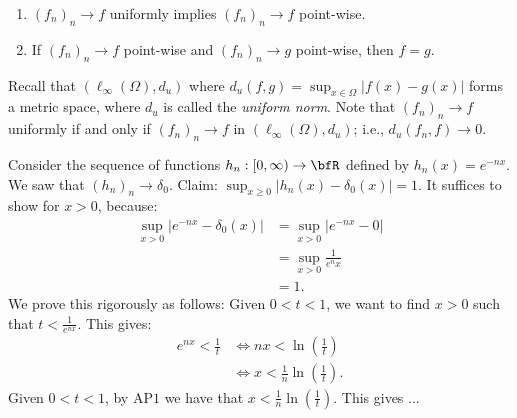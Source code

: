     \begin{proposition}
        \phantom{a}
        \begin{enumerate}[label = (\arabic*)]
            \item $(f_n)_n \rightarrow f$ uniformly implies $(f_n)_n \rightarrow f$ point-wise.
            \item If $(f_n)_n \rightarrow f$ point-wise and $(f_n)_n \rightarrow g$ point-wise, then $f = g$.
        \end{enumerate}
    \end{proposition}

    \begin{note}
        Recall that $(\ell_\infty(\Omega),d_u)$ where $d_u(f,g) = \sup_{x \in \Omega}|f(x)-g(x)|$ forms a metric space, where $d_u$ is called the \textit{uniform norm}. Note that $(f_n)_n \rightarrow f$ uniformly if and only if $(f_n)_n \rightarrow f$ in $(\ell_\infty(\Omega),d_u)$; i.e., $d_u(f_n,f) \rightarrow 0$.
    \end{note}

    \begin{example}
        Consider the sequence of functions $h_n: [0,\infty) \rightarrow \bfR$ defined by $h_n(x) = e^{-nx}$. We saw that $(h_n)_n \rightarrow \delta_0$. Claim: $\sup_{x \geq 0}|h_n(x) - \delta_0(x)| = 1$. It suffices to show for $x>0$, because:
            \begin{equation*}
            \begin{split}
                \sup_{x > 0}|e^{-nx} - \delta_0(x)|
                & = \sup_{x > 0 }|e^{-nx} - 0| \\
                & = \sup_{x > 0}\frac{1}{e^nx} \\
                & = 1.
            \end{split}
            \end{equation*}
        We prove this rigorously as follows: Given $0 < t < 1$, we want to find $x > 0$ such that $t < \frac{1}{e^{nx}}$. This gives:
            \begin{equation*}
            \begin{split}
                e^{nx} < \frac{1}{t} 
                &\iff nx < \ln\left(\frac{1}{t}\right) \\
                &\iff x < \frac{1}{n}\ln\left(\frac{1}{t}\right).
            \end{split}
            \end{equation*}
        Given $0 < t< 1$, by AP$1$ we have that $x < \frac{1}{n}\ln\left(\frac{1}{t}\right)$. This gives ...
    \end{example}

